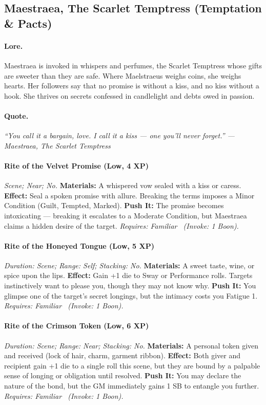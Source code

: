 \subsection{Maestraea, The Scarlet Temptress (Temptation \& Pacts)}

\paragraph{Lore.}  
Maestraea is invoked in whispers and perfumes, the Scarlet Temptress whose gifts are sweeter than they are safe. Where Maelstraeus weighs coins, she weighs hearts. Her followers say that no promise is without a kiss, and no kiss without a hook. She thrives on secrets confessed in candlelight and debts owed in passion.  

\paragraph{Quote.}  
\emph{“You call it a bargain, love. I call it a kiss — one you’ll never forget.” — Maestraea, The Scarlet Temptress}  

\paragraph{Rite of the Velvet Promise (Low, 4 XP)} 
\emph{Scene; Near; No.}  
\textbf{Materials:} A whispered vow sealed with a kiss or caress.  
\textbf{Effect:} Seal a spoken promise with allure. Breaking the terms imposes a Minor Condition (Guilt, Tempted, Marked).  
\textbf{Push It:} The promise becomes intoxicating — breaking it escalates to a Moderate Condition, but Maestraea claims a hidden desire of the target.  
\emph{Requires: Familiar \ (\textit{Invoke:} 1 Boon).}  

\paragraph{Rite of the Honeyed Tongue (Low, 5 XP)}  
\emph{Duration: Scene; Range: Self; Stacking: No.}  
\textbf{Materials:} A sweet taste, wine, or spice upon the lips.  
\textbf{Effect:} Gain +1 die to Sway or Performance rolls. Targets instinctively want to please you, though they may not know why.  
\textbf{Push It:} You glimpse one of the target’s secret longings, but the intimacy costs you Fatigue 1.  
\emph{Requires: Familiar \ (\textit{Invoke:} 1 Boon).}  

\paragraph{Rite of the Crimson Token (Low, 6 XP)}  
\emph{Duration: Scene; Range: Near; Stacking: No.}  
\textbf{Materials:} A personal token given and received (lock of hair, charm, garment ribbon).  
\textbf{Effect:} Both giver and recipient gain +1 die to a single roll this scene, but they are bound by a palpable sense of longing or obligation until resolved.  
\textbf{Push It:} You may declare the nature of the bond, but the GM immediately gains 1 SB to entangle you further.  
\emph{Requires: Familiar \ (\textit{Invoke:} 1 Boon).}  

